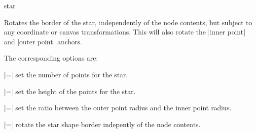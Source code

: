 \begin{shape}{star}
	\begin{command}{\pgfsetstarrotate{}}
		Rotates the border of the star, independently of the node contents,
		but subject to any coordinate or canvas transformations.	This will
		also rotate the |inner point| and |outer point| anchors.
		
\begin{codeexample}[]
\end{codeexample}

	\end{command}
	
	The corresponding \tikzname{} options are:

	\begin{itemize}
   	|=|
    	set the number of points for the star.
    
   	|=|
   	set the height of the points for the star.
    
    	|=|
    	set the ratio between the outer point radius and the inner point
   	radius.
    
    	|=|
    	rotate the star shape border indepently of the node contents.
     
	\end{itemize}
\end{shape}